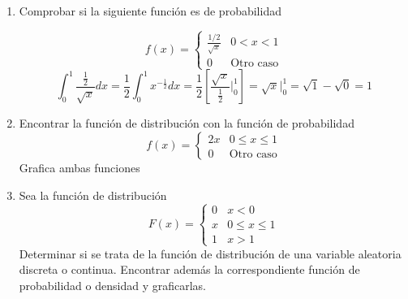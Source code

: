 \documentclass[a4paper, 12pt]{article}
\newcommand{\Pspace}{0.5cm}
\newcommand{\Aspace}{0.2cm}
\begin{document}
    \begin{enumerate}
        \item Comprobar si la siguiente función es de probabilidad \par
        \[
            f(x) =
            \begin{cases}
                \frac{1 / 2}{\sqrt{x}} & 0 < x < 1 \\
                0 & \text{Otro caso}
            \end{cases}
        \]
            \vspace{\Aspace}
            { \color{azul} 
                \[  \int_{0}^{1}\frac{\frac{1}{2}}{\sqrt{x}}dx 
                    = \frac{1}{2} \int_{0}^{1}x^{-\frac{1}{2}}dx
                    = \frac{1}{2} \left[ \frac{\sqrt{x}}{\frac{1}{2}} \Big|_{0}^{1} \right]
                    = \sqrt{x} \Big|_{0}^{1}
                    = \sqrt{1} - \sqrt{0} = 1
                \]
            }

        \vspace{\Pspace}
        \item Encontrar la función de distribución con la función de probabilidad
        \[
            f(x) =
            \begin{cases}
                2x & 0 \leq x \leq 1 \\
                0 & \text{Otro caso}
            \end{cases}
        \]       
        Grafica ambas funciones

            \vspace{\Aspace} \par
            { \color{azul}  }


        \item Sea la función de distribución
        \[
            F(x) =
            \begin{cases}
                0 & x < 0 \\
                x & 0 \leq x \leq 1 \\
                1 & x > 1
            \end{cases}
        \]
        Determinar si se trata de la función de distribución de una variable aleatoria discreta o continua. Encontrar además la correspondiente función de probabilidad o densidad y graficarlas.
    \end{enumerate}
\end{document}
